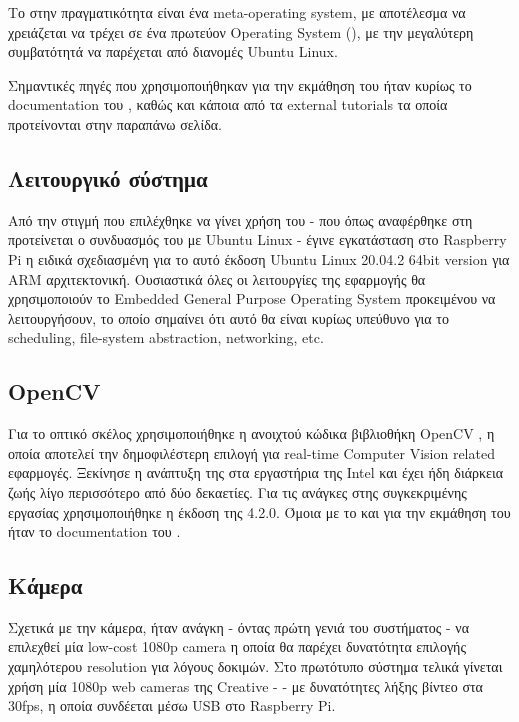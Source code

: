 Το  στην πραγματικότητα είναι ένα meta-operating system, με αποτέλεσμα να χρειάζεται να τρέχει σε ένα πρωτεύον Operating System (), με την μεγαλύτερη συμβατότητά να παρέχεται από διανομές Ubuntu Linux. 

Σημαντικές πηγές που χρησιμοποιήθηκαν για την εκμάθηση του  ήταν κυρίως το documentation του \cite{ros-doc}, καθώς και κάποια από τα external tutorials τα οποία προτείνονται στην παραπάνω σελίδα.

\subsection{Λειτουργικό σύστημα}
Από την στιγμή που επιλέχθηκε να γίνει χρήση του  - που όπως αναφέρθηκε στη  προτείνεται ο συνδυασμός του με Ubuntu Linux - έγινε εγκατάσταση στο Raspberry Pi η ειδικά σχεδιασμένη για το αυτό έκδοση Ubuntu Linux 20.04.2 64bit version για ΑRM \cite{ubuntu-raspberry} αρχιτεκτονική. Ουσιαστικά όλες οι λειτουργίες της εφαρμογής θα χρησιμοποιούν το Embedded General Purpose Operating System προκειμένου να λειτουργήσουν, το οποίο σημαίνει ότι αυτό θα είναι κυρίως υπεύθυνο για το scheduling, file-system abstraction, networking, etc. 

\subsection{OpenCV}
Για το οπτικό σκέλος χρησιμοποιήθηκε η ανοιχτού κώδικα βιβλιοθήκη OpenCV \cite{opencv}, η οποία αποτελεί την δημοφιλέστερη επιλογή για real-time Computer Vision related εφαρμογές. Ξεκίνησε η ανάπτυξη της στα εργαστήρια της Intel και έχει ήδη διάρκεια ζωής λίγο περισσότερο από δύο δεκαετίες. Για τις ανάγκες στης συγκεκριμένης εργασίας χρησιμοποιήθηκε η έκδοση της 4.2.0. Όμοια με το  και για την εκμάθηση του  ήταν το documentation του .

\subsection{Κάμερα}
Σχετικά με την κάμερα, ήταν ανάγκη - όντας πρώτη γενιά του συστήματος -  να επιλεχθεί μία low-cost 1080p camera η οποία θα παρέχει δυνατότητα επιλογής χαμηλότερου resolution για λόγους δοκιμών. Στο πρωτότυπο σύστημα τελικά γίνεται χρήση μία 1080p web cameras της Creative \cite{creative-camera} -  - με δυνατότητες λήξης βίντεο στα 30fps, η οποία συνδέεται μέσω USB στο Raspberry Pi.

